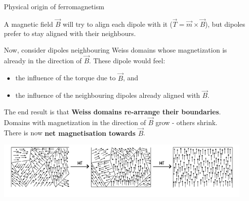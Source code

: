 %
%
%

\begin{frame}{Physical origin of ferromagnetism}

A magnetic field $\vec{B}$ will try to align each dipole with it
($\vec{T} = \vec{m} \times \vec{B}$), but dipoles prefer to stay aligned with their neighbours.\\

\vspace{0.1cm}

Now, consider dipoles neighbouring Weiss domains whose magnetization is already in the direction of $\vec{B}$.
These dipole would feel:
\begin{itemize}
\item the influence of the torque due to $\vec{B}$, and
\item the influence of the neighbouring dipoles already aligned with $\vec{B}$.
\end{itemize}
The end result is that {\bf  Weiss domains re-arrange their boundaries}.\\
Domains with magnetization in the direction of $\vec{B}$ grow - others shrink.\\
There is now {\bf net magnetisation towards $\vec{B}$}.\\

\begin{center}
   \includegraphics[width=0.96\textwidth]{./images/schematics/weiss_domains_02.png}\\
\end{center}

\end{frame}

%
%
%

